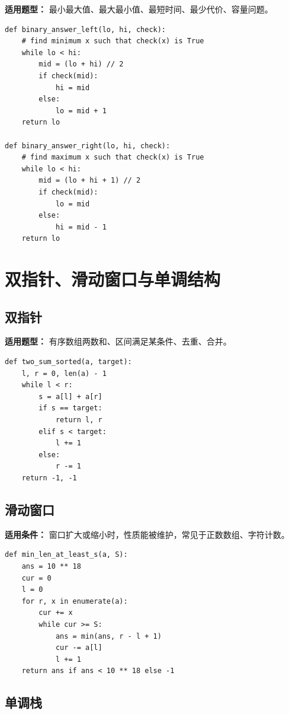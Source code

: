 \documentclass[UTF8,a4paper,14pt]{ctexart}
\begin{document}
\textbf{适用题型：}
最小最大值、最大最小值、最短时间、最少代价、容量问题。

\begin{lstlisting}
def binary_answer_left(lo, hi, check):
    # find minimum x such that check(x) is True
    while lo < hi:
        mid = (lo + hi) // 2
        if check(mid):
            hi = mid
        else:
            lo = mid + 1
    return lo

def binary_answer_right(lo, hi, check):
    # find maximum x such that check(x) is True
    while lo < hi:
        mid = (lo + hi + 1) // 2
        if check(mid):
            lo = mid
        else:
            hi = mid - 1
    return lo
\end{lstlisting}

\section{双指针、滑动窗口与单调结构}

\subsection{双指针}

\textbf{适用题型：}
有序数组两数和、区间满足某条件、去重、合并。

\begin{lstlisting}
def two_sum_sorted(a, target):
    l, r = 0, len(a) - 1
    while l < r:
        s = a[l] + a[r]
        if s == target:
            return l, r
        elif s < target:
            l += 1
        else:
            r -= 1
    return -1, -1
\end{lstlisting}

\subsection{滑动窗口}

\textbf{适用条件：}
窗口扩大或缩小时，性质能被维护，常见于正数数组、字符计数。

\begin{lstlisting}
def min_len_at_least_s(a, S):
    ans = 10 ** 18
    cur = 0
    l = 0
    for r, x in enumerate(a):
        cur += x
        while cur >= S:
            ans = min(ans, r - l + 1)
            cur -= a[l]
            l += 1
    return ans if ans < 10 ** 18 else -1
\end{lstlisting}

\subsection{单调栈}
\end{document}
